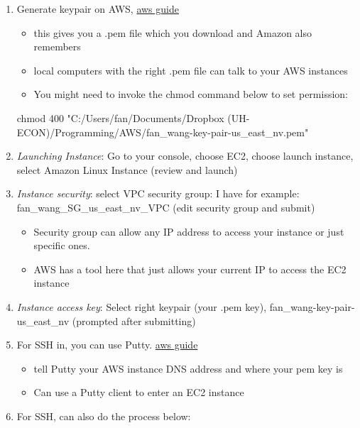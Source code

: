 \documentclass[
]{book}
\newenvironment{Shaded}{\begin{snugshade}}{\end{snugshade}}
\newcommand{\FunctionTok}[1]{\textcolor[rgb]{0.00,0.00,0.00}{#1}}
\newcommand{\NormalTok}[1]{#1}
\newcommand{\StringTok}[1]{\textcolor[rgb]{0.31,0.60,0.02}{#1}}
\providecommand{\tightlist}{%
  \setlength{\itemsep}{0pt}\setlength{\parskip}{0pt}}
\begin{document}
\begin{enumerate}
\def\labelenumi{\arabic{enumi}.}
\tightlist
\item
  Generate keypair on AWS, \href{https://docs.aws.amazon.com/AWSEC2/latest/UserGuide/ec2-key-pairs.html\#having-ec2-create-your-key-pair}{aws guide}

  \begin{itemize}
  \tightlist
  \item
    this gives you a .pem file which you download and Amazon also remembers
  \item
    local computers with the right .pem file can talk to your AWS instances
  \item
    You might need to invoke the chmod command below to set permission:
  \end{itemize}

\begin{Shaded}
\begin{Highlighting}[]
\FunctionTok{chmod}\NormalTok{ 400 }\StringTok{"C:/Users/fan/Documents/Dropbox (UH{-}ECON)/Programming/AWS/fan\_wang{-}key{-}pair{-}us\_east\_nv.pem"}
\end{Highlighting}
\end{Shaded}
\item
  \emph{Launching Instance}: Go to your console, choose EC2, choose launch instance, select Amazon Linux Instance (review and launch)
\item
  \emph{Instance security}: select VPC security group: I have for example: fan\_wang\_SG\_us\_east\_nv\_VPC (edit security group and submit)

  \begin{itemize}
  \tightlist
  \item
    Security group can allow any IP address to access your instance or just specific ones.
  \item
    AWS has a tool here that just allows your current IP to access the EC2 instance
  \end{itemize}
\item
  \emph{Instance access key}: Select right keypair (your .pem key), fan\_wang-key-pair-us\_east\_nv (prompted after submitting)
\item
  For SSH in, you can use Putty. \href{https://docs.aws.amazon.com/AWSEC2/latest/UserGuide/putty.html}{aws guide}

  \begin{itemize}
  \tightlist
  \item
    tell Putty your AWS instance DNS address and where your pem key is
  \item
    Can use a Putty client to enter an EC2 instance
  \end{itemize}
\item
  For SSH, can also do the process below:


\end{enumerate}
\end{document}
